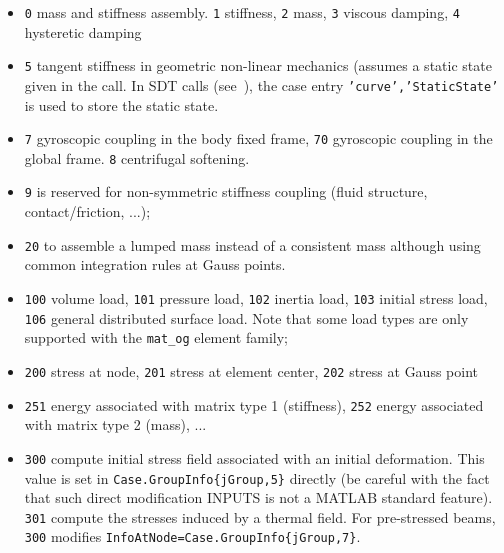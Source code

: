\begin{itemize}
\item {\tt 0} mass and stiffness assembly.  {\tt 1} stiffness, {\tt 2} mass, {\tt 3} viscous damping,  {\tt 4} hysteretic damping 
\item {\tt 5} tangent stiffness in geometric non-linear mechanics (assumes a static state given in the call. In SDT calls (see~), the case entry {\tt 'curve','StaticState'} is used to store the static state.
\item {\tt 7} gyroscopic coupling in the body fixed frame, {\tt 70} gyroscopic coupling in the global frame. {\tt 8} centrifugal softening. 
\item {\tt 9} is reserved for non-symmetric stiffness coupling (fluid structure, contact/friction, ...);
\item {\tt 20} to assemble a lumped mass instead of a consistent mass although using common integration rules at Gauss points.
\item {\tt 100} volume load, {\tt 101} pressure load, {\tt 102} inertia load, {\tt 103} initial stress load, {\tt 106} general distributed surface load. Note that some load types are only supported with the {\tt mat\_og} element family; 
\item {\tt 200} stress at node, {\tt 201} stress at element center, {\tt 202} stress at Gauss point
\item {\tt 251} energy associated with matrix type 1 (stiffness), {\tt 252} energy associated with matrix type 2 (mass), ...  
\item {\tt 300} compute initial stress field associated with an initial deformation. This value is set in {\tt Case.GroupInfo\{jGroup,5\}} directly (be careful with the fact that such direct modification INPUTS is not a MATLAB standard feature). {\tt 301} compute the stresses induced by a thermal field. For pre-stressed beams, {\tt 300} modifies  {\tt InfoAtNode=Case.GroupInfo\{jGroup,7\}}.

\end{itemize}

